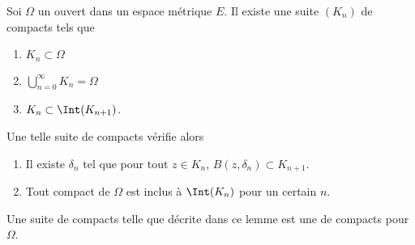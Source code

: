 \begin{lemma}       \label{LemGDeZlOo}
    Soi \( \Omega\) un ouvert dans un espace métrique \( E\). Il existe une suite \( (K_n)\) de compacts tels que
    \begin{enumerate}
        \item
            \( K_n\subset \Omega\)
        \item
            \( \bigcup_{n=0}^{\infty}K_n=\Omega\)
        \item
            \( K_n\subset\Int(K_{n+1})\).
    \end{enumerate}
    Une telle suite de compacts vérifie alors
    \begin{enumerate}
        \item
            Il existe \( \delta_n\) tel que pour tout \( z\in K_n\), \( B(z,\delta_n)\subset K_{n+1}\).
        \item
            Tout compact de \( \Omega\) est inclus à \( \Int(K_n)\) pour un certain \( n\).            
    \end{enumerate}
\end{lemma}
Une suite de compacts telle que décrite dans ce lemme est une  de compacts pour \( \Omega\).

